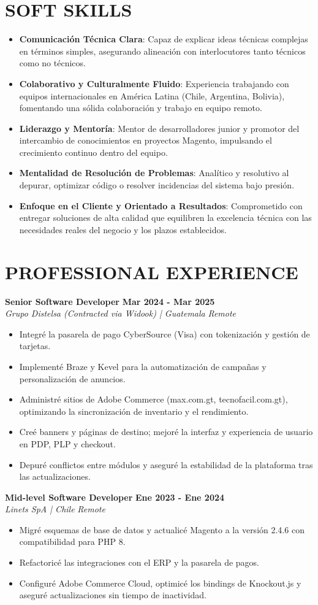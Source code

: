 \documentclass[11pt, a4paper]{article}
\newcommand{\header}[1]{\section*{\fontsize{10.5}{11}\selectfont\bfseries\color{accent}\uppercase{#1}}}
\newcommand{\jobtitle}[2]{\textbf{#1} \hfill \textbf{\small #2}} %
\newcommand{\company}[1]{\textit{#1}} %
\begin{document}
\header{Soft Skills}
\begin{itemize}[noitemsep, topsep=3pt]
	\item \textbf{Comunicación Técnica Clara}: Capaz de explicar ideas técnicas complejas en términos simples, asegurando alineación con interlocutores tanto técnicos como no técnicos.
	\item \textbf{Colaborativo y Culturalmente Fluido}: Experiencia trabajando con equipos internacionales en América Latina (Chile, Argentina, Bolivia), fomentando una sólida colaboración y trabajo en equipo remoto.
	\item \textbf{Liderazgo y Mentoría}: Mentor de desarrolladores junior y promotor del intercambio de conocimientos en proyectos Magento, impulsando el crecimiento continuo dentro del equipo.
	\item \textbf{Mentalidad de Resolución de Problemas}: Analítico y resolutivo al depurar, optimizar código o resolver incidencias del sistema bajo presión.
	\item \textbf{Enfoque en el Cliente y Orientado a Resultados}: Comprometido con entregar soluciones de alta calidad que equilibren la excelencia técnica con las necesidades reales del negocio y los plazos establecidos.
\end{itemize}


\header{Professional Experience}
\jobtitle{Senior Software Developer}{Mar 2024 - Mar 2025} \\
\company{Grupo Distelsa (Contracted via Widook) | Guatemala} \hfill \textit{Remote}
\begin{itemize}[noitemsep, topsep=3pt]
	\item Integré la pasarela de pago CyberSource (Visa) con tokenización y gestión de tarjetas.
	\item Implementé Braze y Kevel para la automatización de campañas y personalización de anuncios.
	\item Administré sitios de Adobe Commerce (max.com.gt, tecnofacil.com.gt), optimizando la sincronización de inventario y el rendimiento.
	\item Creé banners y páginas de destino; mejoré la interfaz y experiencia de usuario en PDP, PLP y checkout.
	\item Depuré conflictos entre módulos y aseguré la estabilidad de la plataforma tras las actualizaciones.
\end{itemize}

\jobtitle{Mid-level Software Developer}{Ene 2023 - Ene 2024} \\
\company{Linets SpA | Chile} \hfill \textit{Remote}
\begin{itemize}[noitemsep, topsep=3pt]
	\item Migré esquemas de base de datos y actualicé Magento a la versión 2.4.6 con compatibilidad para PHP 8.
	\item Refactoricé las integraciones con el ERP y la pasarela de pagos.
	\item Configuré Adobe Commerce Cloud, optimicé los bindings de Knockout.js y aseguré actualizaciones sin tiempo de inactividad.
\end{itemize}
\end{document}
